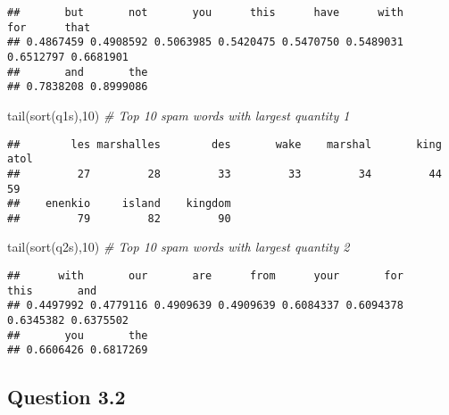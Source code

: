 \documentclass[
]{article}
\newenvironment{Shaded}{\begin{snugshade}}{\end{snugshade}}
\newcommand{\CommentTok}[1]{\textcolor[rgb]{0.56,0.35,0.01}{\textit{#1}}}
\newcommand{\DecValTok}[1]{\textcolor[rgb]{0.00,0.00,0.81}{#1}}
\newcommand{\FunctionTok}[1]{\textcolor[rgb]{0.00,0.00,0.00}{#1}}
\newcommand{\NormalTok}[1]{#1}
\begin{document}
\begin{verbatim}
##       but       not       you      this      have      with       for      that 
## 0.4867459 0.4908592 0.5063985 0.5420475 0.5470750 0.5489031 0.6512797 0.6681901 
##       and       the 
## 0.7838208 0.8999086
\end{verbatim}

\begin{Shaded}
\begin{Highlighting}[]
\FunctionTok{tail}\NormalTok{(}\FunctionTok{sort}\NormalTok{(q1s),}\DecValTok{10}\NormalTok{) }\CommentTok{\# Top 10 spam words with largest quantity 1}
\end{Highlighting}
\end{Shaded}

\begin{verbatim}
##        les marshalles        des       wake    marshal       king       atol 
##         27         28         33         33         34         44         59 
##    enenkio     island    kingdom 
##         79         82         90
\end{verbatim}

\begin{Shaded}
\begin{Highlighting}[]
\FunctionTok{tail}\NormalTok{(}\FunctionTok{sort}\NormalTok{(q2s),}\DecValTok{10}\NormalTok{) }\CommentTok{\# Top 10 spam words with largest quantity 2}
\end{Highlighting}
\end{Shaded}

\begin{verbatim}
##      with       our       are      from      your       for      this       and 
## 0.4497992 0.4779116 0.4909639 0.4909639 0.6084337 0.6094378 0.6345382 0.6375502 
##       you       the 
## 0.6606426 0.6817269
\end{verbatim}

\hypertarget{question-3.2}{%
\subsection{Question 3.2}\label{question-3.2}}
\end{document}
